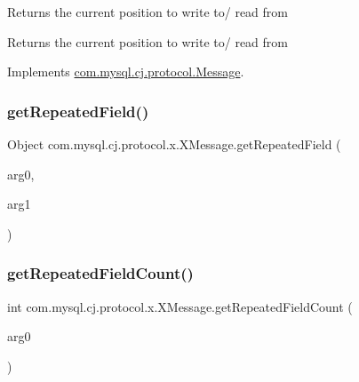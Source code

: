 Returns the current position to write to/ read from

\begin{DoxyReturn}{Returns}
the current position to write to/ read from 
\end{DoxyReturn}


Implements \mbox{\hyperlink{interfacecom_1_1mysql_1_1cj_1_1protocol_1_1_message_a87a2626f6e5aceccffe224bcaf0e126b}{com.\+mysql.\+cj.\+protocol.\+Message}}.

\mbox{\label{classcom_1_1mysql_1_1cj_1_1protocol_1_1x_1_1_x_message_a942085f6643a35b8431217a5ff67f79e}} 
\subsubsection{\texorpdfstring{get\+Repeated\+Field()}{getRepeatedField()}}
{\footnotesize\ttfamily Object com.\+mysql.\+cj.\+protocol.\+x.\+X\+Message.\+get\+Repeated\+Field (\begin{DoxyParamCaption}\item[{Field\+Descriptor}]{arg0,  }\item[{int}]{arg1 }\end{DoxyParamCaption})}

\mbox{\label{classcom_1_1mysql_1_1cj_1_1protocol_1_1x_1_1_x_message_a17049fc01e514cb0dff7dee015479bdb}} 
\subsubsection{\texorpdfstring{get\+Repeated\+Field\+Count()}{getRepeatedFieldCount()}}
{\footnotesize\ttfamily int com.\+mysql.\+cj.\+protocol.\+x.\+X\+Message.\+get\+Repeated\+Field\+Count (\begin{DoxyParamCaption}\item[{Field\+Descriptor}]{arg0 }\end{DoxyParamCaption})}

